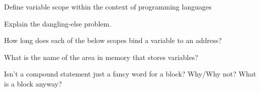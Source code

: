 \documentclass{exam} %
\begin{document}
\begin{questions}
  \pagebreak

  \question Define variable scope within the context of programming languages

  \question Explain the dangling-else problem.

  \question How long does each of the below scopes bind a variable to an address?

  \question What is the name of the area in memory that stores variables?

  \question Isn't a compound statement just a fancy word for a block? Why/Why not? What is a block anyway?


\end{questions}
\end{document}
